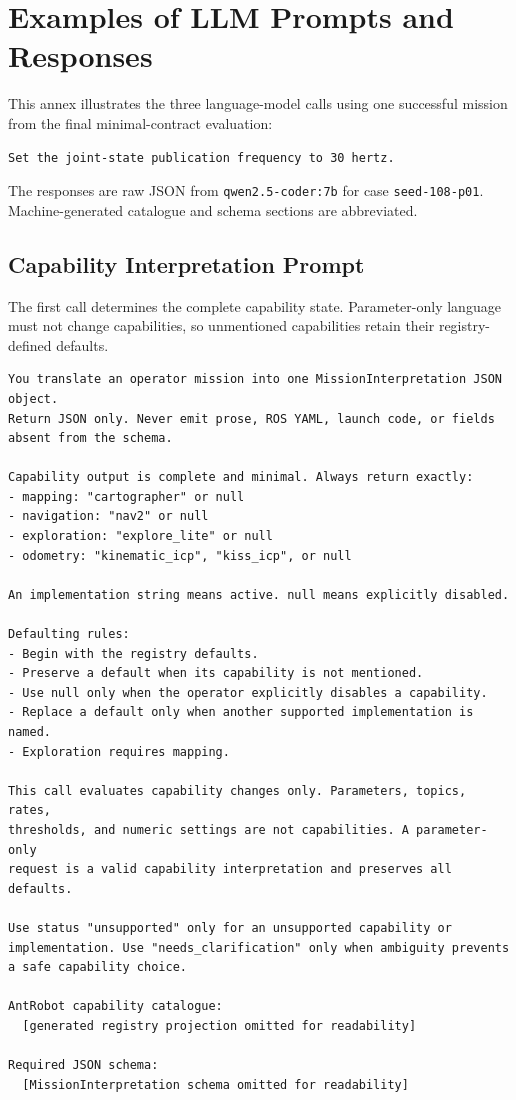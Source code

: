 \chapter{Examples of LLM Prompts and Responses}
\label{annex:llm-prompts}

This annex illustrates the three language-model calls using one successful mission from the final minimal-contract evaluation:

\begin{lstlisting}[style=annexcode,caption={User mission supplied to all three calls.}]
Set the joint-state publication frequency to 30 hertz.
\end{lstlisting}

The responses are raw JSON from \texttt{qwen2.5-coder:7b} for case \texttt{seed-108-p01}. Machine-generated catalogue and schema sections are abbreviated.

\section{Capability Interpretation Prompt}

The first call determines the complete capability state. Parameter-only language must not change capabilities, so unmentioned capabilities retain their registry-defined defaults.

\begin{lstlisting}[style=annexcode,caption={Representative capability-interpretation system message.},label={lst:capability-system-prompt}]
You translate an operator mission into one MissionInterpretation JSON object.
Return JSON only. Never emit prose, ROS YAML, launch code, or fields absent from the schema.

Capability output is complete and minimal. Always return exactly:
- mapping: "cartographer" or null
- navigation: "nav2" or null
- exploration: "explore_lite" or null
- odometry: "kinematic_icp", "kiss_icp", or null

An implementation string means active. null means explicitly disabled.

Defaulting rules:
- Begin with the registry defaults.
- Preserve a default when its capability is not mentioned.
- Use null only when the operator explicitly disables a capability.
- Replace a default only when another supported implementation is named.
- Exploration requires mapping.

This call evaluates capability changes only. Parameters, topics, rates,
thresholds, and numeric settings are not capabilities. A parameter-only
request is a valid capability interpretation and preserves all defaults.

Use status "unsupported" only for an unsupported capability or
implementation. Use "needs_clarification" only when ambiguity prevents
a safe capability choice.

AntRobot capability catalogue:
  [generated registry projection omitted for readability]

Required JSON schema:
  [MissionInterpretation schema omitted for readability]
\end{lstlisting}

